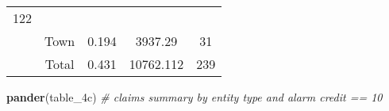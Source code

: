 \documentclass[]{book}
\newenvironment{Shaded}{\begin{snugshade}}{\end{snugshade}}
\newcommand{\KeywordTok}[1]{\textcolor[rgb]{0.13,0.29,0.53}{\textbf{#1}}}
\newcommand{\CommentTok}[1]{\textcolor[rgb]{0.56,0.35,0.01}{\textit{#1}}}
\newcommand{\NormalTok}[1]{#1}
\theoremstyle{definition}
\theoremstyle{definition}
\theoremstyle{definition}
\theoremstyle{remark}
\begin{document}
\begin{longtable}[]{@{}ccccc@{}}
\begin{minipage}[t]{0.14\columnwidth}
122\strut
\end{minipage}\tabularnewline
\begin{minipage}[t]{0.12\columnwidth}\centering\strut
\strut
\end{minipage} & \begin{minipage}[t]{0.12\columnwidth}\centering\strut
Town\strut
\end{minipage} & \begin{minipage}[t]{0.11\columnwidth}\centering\strut
0.194\strut
\end{minipage} & \begin{minipage}[t]{0.14\columnwidth}\centering\strut
3937.29\strut
\end{minipage} & \begin{minipage}[t]{0.14\columnwidth}\centering\strut
31\strut
\end{minipage}\tabularnewline
\begin{minipage}[t]{0.12\columnwidth}\centering\strut
\strut
\end{minipage} & \begin{minipage}[t]{0.12\columnwidth}\centering\strut
Total\strut
\end{minipage} & \begin{minipage}[t]{0.11\columnwidth}\centering\strut
0.431\strut
\end{minipage} & \begin{minipage}[t]{0.14\columnwidth}\centering\strut
10762.112\strut
\end{minipage} & \begin{minipage}[t]{0.14\columnwidth}\centering\strut
239\strut
\end{minipage}\tabularnewline
\bottomrule
\end{longtable}

\begin{Shaded}
\begin{Highlighting}[]
\KeywordTok{pander}\NormalTok{(table_4c)  }\CommentTok{# claims summary by entity type and alarm credit == 10}
\end{Highlighting}
\end{Shaded}
\end{document}
